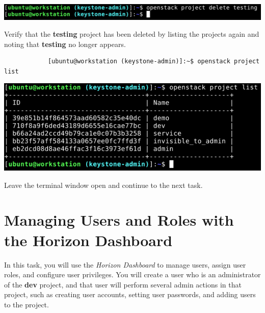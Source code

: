 \documentclass[letterpaper, 12pt]{article}
\begin{document}
\begin{enumerate}
\begin{labstep}
        \begin{center}
            \includegraphics[width=\linewidth]{images/part2/step7.png}
        \end{center}
    \end{labstep}

    \begin{labstep}
        Verify that the \textbf{testing} project has been deleted by listing the projects again and noting that
        \textbf{testing} no longer appears.
        \begin{lstlisting}
            [ubuntu@workstation (keystone-admin)]:~$ openstack project list
        \end{lstlisting}

        \begin{center}
            \includegraphics[width=\linewidth]{images/part2/step8.png}
        \end{center}
    \end{labstep}

    \begin{labstep}
        Leave the terminal window open and continue to the next task.
    \end{labstep}
\end{enumerate}

\section{Managing Users and Roles with the Horizon Dashboard}\label{sec:managing-users-using-the-horizon-dashboard}
In this task, you will use the \textit{Horizon Dashboard} to manage users, assign user roles, and configure user privileges.
You will create a user who is an administrator of the \textbf{dev} project, and that user will perform several admin actions in that project, such as creating user accounts, setting user passwords, and adding users to the project.
\end{document}
